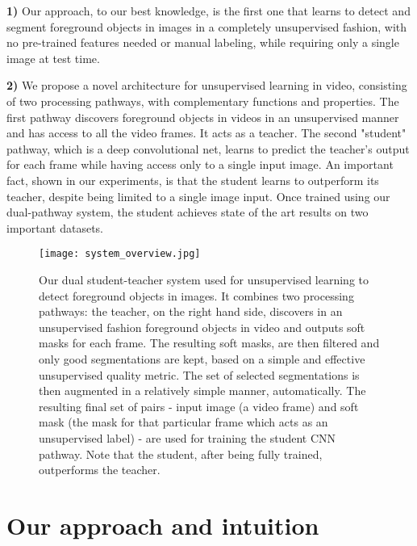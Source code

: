 \documentclass[10pt,twocolumn,letterpaper]{article}
\begin{document}
\textbf{1)} Our approach, to our best knowledge, is the first one that learns to detect and segment foreground objects in images in a completely unsupervised fashion, with no pre-trained features needed or manual labeling, while requiring only a single image at test time.

\textbf{2)} We propose a novel architecture for unsupervised learning in video, consisting of two processing pathways, with complementary functions and properties. The first pathway discovers foreground objects in videos in an unsupervised manner and has access to all the video frames. It acts as a teacher. The second "student" pathway, which is a deep convolutional net, learns to predict the teacher's output for each frame while having access only to a single input image. An important fact, shown in our experiments, is that the student learns to outperform its teacher, despite being limited to a single image input. Once trained using our dual-pathway system, the student achieves state of the art results on two important datasets.

\begin{figure}[t]
\begin{center}
   \texttt{[image: system\_overview.jpg]}
\end{center}
   \caption{Our dual student-teacher system used for unsupervised learning to detect foreground objects in images. It combines two processing pathways: the teacher, on the right hand side, discovers in an unsupervised fashion foreground objects in video and outputs soft masks for each frame. The resulting soft masks, are then filtered and only good segmentations are kept, based on a simple and effective unsupervised quality metric.
   The set of selected segmentations is then augmented in a relatively simple manner, automatically. The resulting final set of pairs - input image (a video frame) and soft mask (the mask for that particular frame which acts as an unsupervised label) - are used for training the student CNN pathway. Note that the student, after being fully trained, outperforms the teacher.
   }
\label{fig:system}
\end{figure}

\section{Our approach and intuition}
\end{document}
